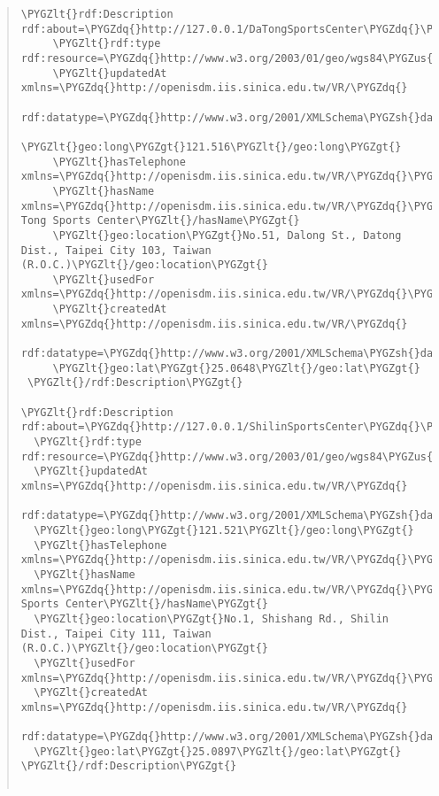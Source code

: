 \documentclass[letterpaper,10pt,english]{sphinxmanual}
\def\PYGZus{\char`\_}
\def\PYGZlt{\char`\<}
\def\PYGZgt{\char`\>}
\def\PYGZsh{\char`\#}
\def\PYGZhy{\char`\-}
\def\PYGZdq{\char`\"}
\begin{document}
\begin{quote}
\begin{description}
\begin{Verbatim}[commandchars=\\\{\}]
 \PYGZlt{}rdf:Description rdf:about=\PYGZdq{}http://127.0.0.1/DaTongSportsCenter\PYGZdq{}\PYGZgt{}
     \PYGZlt{}rdf:type rdf:resource=\PYGZdq{}http://www.w3.org/2003/01/geo/wgs84\PYGZus{}pos\PYGZsh{}SpatialThing\PYGZdq{}/\PYGZgt{}
     \PYGZlt{}updatedAt xmlns=\PYGZdq{}http://openisdm.iis.sinica.edu.tw/VR/\PYGZdq{}
         rdf:datatype=\PYGZdq{}http://www.w3.org/2001/XMLSchema\PYGZsh{}dateTime\PYGZdq{}\PYGZgt{}2013\PYGZhy{}07\PYGZhy{}31T03:23:47Z\PYGZlt{}/updatedAt\PYGZgt{}
     \PYGZlt{}geo:long\PYGZgt{}121.516\PYGZlt{}/geo:long\PYGZgt{}
     \PYGZlt{}hasTelephone xmlns=\PYGZdq{}http://openisdm.iis.sinica.edu.tw/VR/\PYGZdq{}\PYGZgt{}2592\PYGZhy{}0055\PYGZlt{}/hasTelephone\PYGZgt{}
     \PYGZlt{}hasName xmlns=\PYGZdq{}http://openisdm.iis.sinica.edu.tw/VR/\PYGZdq{}\PYGZgt{}Da Tong Sports Center\PYGZlt{}/hasName\PYGZgt{}
     \PYGZlt{}geo:location\PYGZgt{}No.51, Dalong St., Datong Dist., Taipei City 103, Taiwan (R.O.C.)\PYGZlt{}/geo:location\PYGZgt{}
     \PYGZlt{}usedFor xmlns=\PYGZdq{}http://openisdm.iis.sinica.edu.tw/VR/\PYGZdq{}\PYGZgt{}Sport\PYGZlt{}/usedFor\PYGZgt{}
     \PYGZlt{}createdAt xmlns=\PYGZdq{}http://openisdm.iis.sinica.edu.tw/VR/\PYGZdq{}
         rdf:datatype=\PYGZdq{}http://www.w3.org/2001/XMLSchema\PYGZsh{}dateTime\PYGZdq{}\PYGZgt{}2012\PYGZhy{}11\PYGZhy{}28T09:05:13Z\PYGZlt{}/createdAt\PYGZgt{}
     \PYGZlt{}geo:lat\PYGZgt{}25.0648\PYGZlt{}/geo:lat\PYGZgt{}
 \PYGZlt{}/rdf:Description\PYGZgt{}

\PYGZlt{}rdf:Description rdf:about=\PYGZdq{}http://127.0.0.1/ShilinSportsCenter\PYGZdq{}\PYGZgt{}
  \PYGZlt{}rdf:type rdf:resource=\PYGZdq{}http://www.w3.org/2003/01/geo/wgs84\PYGZus{}pos\PYGZsh{}SpatialThing\PYGZdq{}/\PYGZgt{}
  \PYGZlt{}updatedAt xmlns=\PYGZdq{}http://openisdm.iis.sinica.edu.tw/VR/\PYGZdq{}
      rdf:datatype=\PYGZdq{}http://www.w3.org/2001/XMLSchema\PYGZsh{}dateTime\PYGZdq{}\PYGZgt{}2013\PYGZhy{}07\PYGZhy{}31T03:23:47Z\PYGZlt{}/updatedAt\PYGZgt{}
  \PYGZlt{}geo:long\PYGZgt{}121.521\PYGZlt{}/geo:long\PYGZgt{}
  \PYGZlt{}hasTelephone xmlns=\PYGZdq{}http://openisdm.iis.sinica.edu.tw/VR/\PYGZdq{}\PYGZgt{}2880\PYGZhy{}6066\PYGZlt{}/hasTelephone\PYGZgt{}
  \PYGZlt{}hasName xmlns=\PYGZdq{}http://openisdm.iis.sinica.edu.tw/VR/\PYGZdq{}\PYGZgt{}Shilin Sports Center\PYGZlt{}/hasName\PYGZgt{}
  \PYGZlt{}geo:location\PYGZgt{}No.1, Shishang Rd., Shilin Dist., Taipei City 111, Taiwan (R.O.C.)\PYGZlt{}/geo:location\PYGZgt{}
  \PYGZlt{}usedFor xmlns=\PYGZdq{}http://openisdm.iis.sinica.edu.tw/VR/\PYGZdq{}\PYGZgt{}Sport\PYGZlt{}/usedFor\PYGZgt{}
  \PYGZlt{}createdAt xmlns=\PYGZdq{}http://openisdm.iis.sinica.edu.tw/VR/\PYGZdq{}
      rdf:datatype=\PYGZdq{}http://www.w3.org/2001/XMLSchema\PYGZsh{}dateTime\PYGZdq{}\PYGZgt{}2012\PYGZhy{}11\PYGZhy{}28T09:05:13Z\PYGZlt{}/createdAt\PYGZgt{}
  \PYGZlt{}geo:lat\PYGZgt{}25.0897\PYGZlt{}/geo:lat\PYGZgt{}
\PYGZlt{}/rdf:Description\PYGZgt{}


\end{Verbatim}
\end{description}
\end{quote}
\end{document}

